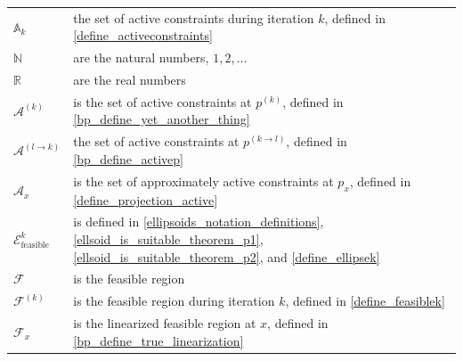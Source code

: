 \documentclass{article}
\theoremstyle{case}
\numberwithin{theorem}{subsection}
\newcommand{\activeconstraintsk}{{\mathbb A_{k}}}
\newcommand{\feasiblek}{{\mathcal F^{(k)}}}
\newcommand{\feasible}{{\mathcal F}}
\newcommand{\naturals}{\mathbb N}
\newcommand{\reals}{\mathbb R}
\newcommand{\unshiftedellipsoid}{{\mathcal E^k_{\textrm{feasible}}}}
\begin{document}
\begin{longtable}{| p{} | p{} |}
$\activeconstraintsk$ & the set of active constraints during iteration $k$, defined in \cref{define_activeconstraints} \\ %
$\naturals $ & are the natural numbers, $1, 2, \ldots$ \\ %
$\reals $ & are the real numbers \\ %
$\mathcal A^{(k)}$ & is the set of active constraints at $p^{(k)}$, defined in \cref{bp_define_yet_another_thing} \\ %
$\mathcal A^{(l \to k)}$ & the set of active constraints at $p^{(k \to l)}$, defined in \cref{bp_define_activep} \\ %
$\mathcal A_x$ & is the set of approximately active constraints at $p_x$, defined in \cref{define_projection_active} \\ %
$\unshiftedellipsoid$ & is defined in \cref{ellipsoids_notation_definitions}, \cref{ellsoid_is_suitable_theorem_p1}, \cref{ellsoid_is_suitable_theorem_p2}, and \cref{define_ellipsek} \\ %
$\feasible$ & is the feasible region \\ %
$\feasiblek$ & is the feasible region during iteration $k$, defined in \cref{define_feasiblek} \\ %
$\mathcal F_x$ & is the linearized feasible region at $x$, defined in \cref{bp_define_true_linearization} \\ %

\end{longtable}
\end{document}

